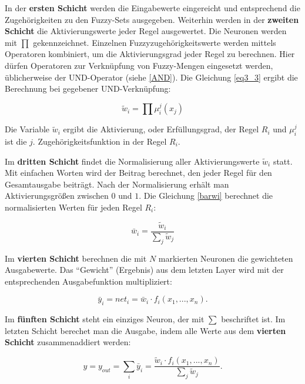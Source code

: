 In der \textbf{ersten Schicht} werden die Eingabewerte eingereicht und entsprechend die Zugehörigkeiten zu den Fuzzy-Sets ausgegeben. Weiterhin werden in der \textbf{zweiten Schicht} die Aktivierungswerte jeder Regel ausgewertet. Die Neuronen werden mit $\prod$ gekennzeichnet. Einzelnen Fuzzyzugehörigkeitswerte werden mittels Operatoren kombiniert, um die Aktivierungsgrad jeder Regel zu berechnen. Hier dürfen Operatoren zur Verknüpfung von Fuzzy-Mengen eingesetzt werden, üblicherweise der UND-Operator (siehe \ref{AND}). Die Gleichung \ref{eq3_3} ergibt die Berechnung bei gegebener UND-Verknüpfung:

\begin{equation}\label{eq3_3}
\tilde{w}_i = \prod \mu_i^j(x_j)
\end{equation}

Die Variable $\tilde{w}_i$ ergibt die Aktivierung, oder Erf\"{u}llungsgrad, der Regel $R_i$ und $\mu_i^j$ ist die $j.$ Zugehörigkeitsfunktion in der Regel $R_i$.

Im \textbf{dritten Schicht} findet die Normalisierung aller Aktivierungswerte $\tilde{w}_i$ statt. Mit einfachen Worten wird der Beitrag berechnet, den jeder Regel für den Gesamtausgabe beiträgt. Nach der Normalisierung erhält man Aktivierungsgrößen zwischen $0$ und $1$. Die Gleichung \ref{barwi} berechnet die normalisierten Werten für jeden Regel $R_i$:

\begin{equation}\label{barwi}
\bar{w}_i = \frac{\tilde{w}_i }{\sum_j \tilde{w}_j } 
\end{equation}

Im \textbf{vierten Schicht} berechnen die mit $N$ markierten Neuronen die gewichteten Ausgabewerte. Das ``Gewicht'' (Ergebnis) aus dem letzten Layer wird mit der entsprechenden Ausgabefunktion multipliziert:

\begin{equation}
\bar{y}_i = net_i = \bar{w}_i\cdot f_i(x_1, ..., x_n). 
\end{equation}

Im \textbf{fünften Schicht} steht ein einziges Neuron, der mit $\sum$ beschriftet ist. Im letzten Schicht berechet man die Ausgabe, indem alle Werte aus dem \textbf{vierten Schicht} zusammenaddiert werden:

\begin{equation}
y = y_{out} = \sum_i \bar{y}_i = \frac{\tilde{w}_i\cdot f_i(x_1, ..., x_n)}{\sum_j \tilde{w}_j}.
\end{equation}

